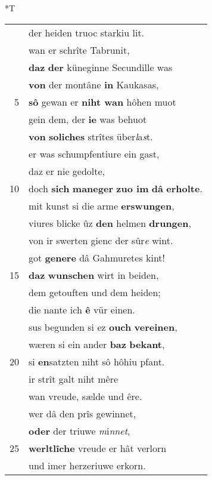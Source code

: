 \documentclass[8pt,a4paper,notitlepage]{article}
\begin{document}
\begin{table}[ht]
\begin{minipage}[t]{0.5\linewidth}
\end{minipage}
\hspace{0.5cm}
\begin{minipage}[t]{0.5\linewidth}
\small
\begin{center}*T
\end{center}
\begin{tabular}{rl}
 & der heiden truoc starkiu lit.\\ 
 & wan er schrîte Tabrunit,\\ 
 & \textbf{daz} \textbf{der} küneginne Secundille was\\ 
 & \textbf{von} der montâne \textbf{in} Kaukasas,\\ 
5 & \textbf{sô} gewan er \textbf{niht wan} hôhen muot\\ 
 & gein dem, der \textbf{ie} was behuot\\ 
 & \textbf{von} \textbf{soliches} strîtes über\textit{l}a\textit{s}t.\\ 
 & er was schumpfentiure ein gast,\\ 
 & daz er nie gedolte,\\ 
10 & doch \textbf{sich} \textbf{maneger} \textbf{zuo im} \textbf{dâ} \textbf{erholte}.\\ 
 & mit kunst si die arme \textbf{erswungen},\\ 
 & viures blicke ûz \textbf{den} helmen \textbf{drungen},\\ 
 & von ir swerten gienc der sûr\textit{e} wint.\\ 
 & got \textbf{genere} dâ Gahmuretes kint!\\ 
15 & \textbf{daz} \textbf{wunschen} wirt in beiden,\\ 
 & dem getouften und dem heiden;\\ 
 & die nante ich \textbf{ê} vür einen.\\ 
 & sus begunden si ez \textbf{ouch} \textbf{vereinen},\\ 
 & wæren si ein ander \textbf{baz} \textbf{bekant},\\ 
20 & si \textbf{en}satzten niht sô hôhiu pfant.\\ 
 & ir strît galt niht mêre\\ 
 & wan vreude, sælde und êre.\\ 
 & wer dâ den prîs gewinnet,\\ 
 & \textbf{oder} der triuwe \textit{m}i\textit{nnet},\\ 
25 & \textbf{werltlîche} vreude er hât verlorn\\ 
 & und imer herzeriuwe erkorn.\\ 

\end{tabular}
\end{minipage}
\end{table}
\end{document}
